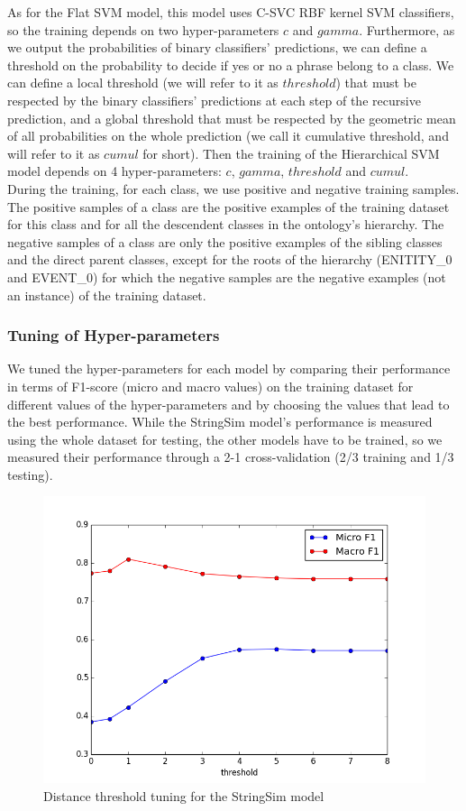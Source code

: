 \documentclass[12pt]{article}
\begin{document}
As for the Flat SVM model, this model uses C-SVC RBF kernel SVM classifiers, so the training depends on two hyper-parameters $c$ and $gamma$. Furthermore, as we output the probabilities of binary classifiers' predictions, we can define a threshold on the probability to decide if yes or no a phrase belong to a class. We can define a local threshold (we will refer to it as $threshold$) that must be respected by the binary classifiers' predictions at each step of the recursive prediction, and a global threshold that must be respected by the geometric mean of all probabilities on the whole prediction (we call it cumulative threshold, and will refer to it as $cumul$ for short). Then the training of the Hierarchical SVM model depends on 4 hyper-parameters: $c$, $gamma$, $threshold$ and $cumul$.\\
During the training, for each class, we use positive and negative training samples. The positive samples of a class are the positive examples of the training dataset for this class and for all the descendent classes in the ontology's hierarchy. The negative samples of a class are only the positive examples of the sibling classes and the direct parent classes, except for the roots of the hierarchy (ENITITY\_0 and EVENT\_0) for which the negative samples are the negative examples (not an instance) of the training dataset.

\subsubsection{Tuning of Hyper-parameters}

We tuned the hyper-parameters for each model by comparing their performance in terms of F1-score (micro and macro values) on the training dataset for different values of the hyper-parameters and by choosing the values that lead to the best performance. While the StringSim model's performance is measured using the whole dataset for testing, the other models have to be trained, so we measured their performance through a 2-1 cross-validation (2/3 training and 1/3 testing).

\begin{figure}[!ht]
   \centering \includegraphics[width=0.7\linewidth]{Figures/Tuning_Figures/instanceClassification_stringSim_tuning.png}
   \caption{\label{stringSimTuning} Distance threshold tuning for the StringSim model}
\end{figure}
\end{document}
